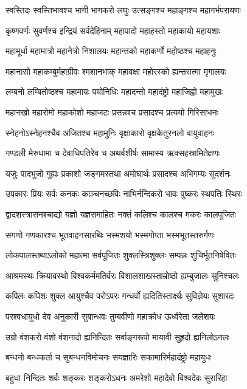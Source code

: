 \twolineshloka
{स्वस्तिदः स्वस्तिभावश्च भागी भागकरो लघुः}%
{उत्सङ्गश्च महाङ्गश्च महागर्भपरायणः}%

\twolineshloka
{कृष्णवर्णः सुवर्णश्च इन्द्रियं सर्वदेहिनाम्}%
{महापादो महाहस्तो महाकायो महायशाः}%

\twolineshloka
{महामूर्धा महामात्रो महानेत्रो निशालयः}%
{महान्तको महाकर्णो महोष्ठश्च महाहनुः}%

\twolineshloka
{महानासो महाकम्बुर्महाग्रीवः श्मशानभाक्}%
{महावक्षा महोरस्को ह्यन्तरात्मा मृगालयः}%

\twolineshloka
{लम्बनो लम्बितोष्ठश्च महामायः पयोनिधिः}%
{महादन्तो महादंष्ट्रो महाजिह्वो महामुखः}%

\twolineshloka
{महानखो महारोमो महाकोशो महाजटः}%
{प्रसन्नश्च प्रसादश्च प्रत्ययो गिरिसाधनः}%

\twolineshloka
{स्नेहनोऽस्नेहनश्चैव अजितश्च महामुनिः}%
{वृक्षाकारो वृक्षकेतुरनलो वायुवाहनः}%

\twolineshloka
{गण्डली मेरुधामा च देवाधिपतिरेव च}%
{अथर्वशीर्षः सामास्य ऋक्सहस्रामितेक्षणः}%

\twolineshloka
{यजुः पादभुजो गुह्यः प्रकाशो जङ्गमस्तथा}%
{अमोघार्थः प्रसादश्च अभिगम्यः सुदर्शनः}%

\twolineshloka
{उपकारः प्रियः सर्वः कनकः काञ्चनच्छविः}%
{नाभिर्नन्दिकरो भावः पुष्करः स्थपतिः स्थिरः}%

\twolineshloka
{द्वादशस्त्रासनश्चाद्यो यज्ञो यज्ञसमाहितः}%
{नक्तं कलिश्च कालश्च मकरः कालपूजितः}%

\twolineshloka
{सगणो गणकारश्च भूतवाहनसारथिः}%
{भस्मशयो भस्मगोप्ता भस्मभूतस्तरुर्गणः}%

\twolineshloka
{लोकपालस्तथाऽलोको महात्मा सर्वपूजितः}%
{शुक्लस्त्रिशुक्लः सम्पन्नः शुचिर्भूतनिषेवितः}%

\twolineshloka
{आश्रमस्थः क्रियावस्थो विश्वकर्ममतिर्वरः}%
{विशालशाखस्ताम्रोष्ठो ह्यम्बुजालः सुनिश्चलः}%

\twolineshloka
{कपिलः कपिशः शुक्ल आयुश्चैव परोऽपरः}%
{गन्धर्वो ह्यदितिस्तार्क्ष्यः सुविज्ञेयः सुशारदः}%

\twolineshloka
{परश्वधायुधो देव अनुकारी सुबान्धवः}%
{तुम्बवीणो महाक्रोध ऊर्ध्वरेता जलेशयः}%

\twolineshloka
{उग्रो वंशकरो वंशो वंशनादो ह्यनिन्दितः}%
{सर्वाङ्गरूपो मायावी सुहृदो ह्यनिलोऽनलः}%

\twolineshloka
{बन्धनो बन्धकर्ता च सुबन्धनविमोचनः}%
{सयज्ञारिः सकामारिर्महादंष्ट्रो महायुधः}%

\twolineshloka
{बहुधा निन्दितः शर्वः शङ्करः शङ्करोऽधनः}%
{अमरेशो महादेवो विश्वदेवः सुरारिहा}%

